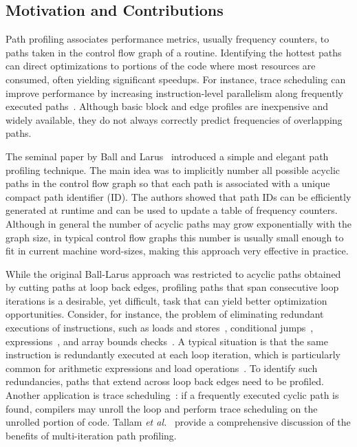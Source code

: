 \subsection{Motivation and Contributions}

Path profiling associates performance metrics, usually frequency counters, to paths taken in the control flow graph of a routine. Identifying the hottest paths can direct optimizations to portions of the code where most resources are consumed, often yielding significant speedups. For instance, trace scheduling can improve performance by increasing instruction-level parallelism along frequently executed paths~\cite{Fisher81,Young98}. Although basic block and edge profiles are inexpensive and widely available, they do not always correctly predict frequencies of overlapping paths. 

The seminal paper by Ball and Larus~\cite{Ball96} introduced a simple and elegant path profiling technique. The main idea was to implicitly number all possible acyclic paths in the control flow graph so that each path is associated with a unique compact path identifier (ID). The authors showed that path IDs can be efficiently generated at runtime and can be used to update a table of frequency counters. Although in general the number of acyclic paths may grow exponentially with the graph size, in typical control flow graphs this number is usually small enough to fit in current machine word-sizes, making this approach very effective in practice.

While the original Ball-Larus approach was restricted to acyclic paths obtained by cutting paths at loop back edges, profiling paths that span consecutive loop iterations is a desirable, yet difficult, task that can yield better optimization opportunities. Consider, for instance, the problem of eliminating redundant executions of instructions, such as loads and stores~\cite{Bodik99}, conditional jumps~\cite{Bodik97}, expressions~\cite{Bodik98,Bodik04}, and array bounds checks~\cite{Bodik00}. A typical situation is that the same instruction is redundantly executed at each loop iteration, which is particularly common for arithmetic expressions and load operations~\cite{Bodik04,Bodik99}. To identify such redundancies, paths that extend across loop back edges need to be profiled. Another application is trace scheduling~\cite{Young98}: if a frequently executed cyclic path is found, compilers may unroll the loop and perform trace scheduling on the unrolled portion of code. Tallam {\em et al.}~\cite{Tallam04} provide a comprehensive discussion of the benefits of multi-iteration path profiling.

